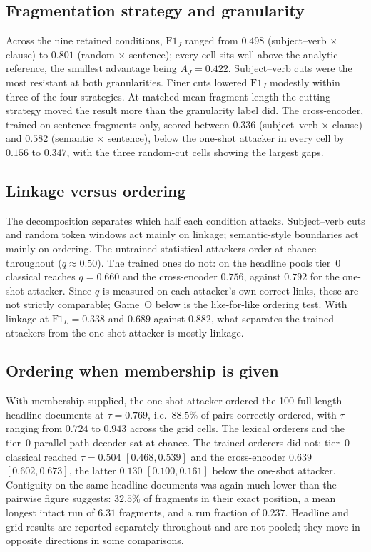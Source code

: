 \documentclass[sigconf,review]{acmart}
\newcommand{\FJ}{\ensuremath{\mathrm{F1}_{J}}}
\newcommand{\FL}{\ensuremath{\mathrm{F1}_{L}}}
\newcommand{\AJ}{\ensuremath{A_{J}}}
\begin{document}
\subsection{Fragmentation strategy and granularity}
\label{sec:res-grid}

Across the nine retained conditions, \FJ{} ranged from $0.498$ (subject--verb
$\times$ clause) to $0.801$ (random $\times$ sentence); every cell sits well
above the analytic reference, the smallest advantage being $\AJ = 0.422$.
Subject--verb cuts were the most resistant at both granularities. Finer cuts
lowered \FJ{} modestly within three of the four strategies. At matched mean
fragment length the cutting strategy moved the result more than the granularity
label did. The cross-encoder, trained on sentence fragments only, scored
between $0.336$ (subject--verb $\times$ clause) and $0.582$
(semantic $\times$ sentence), below the one-shot attacker in every cell by
$0.156$ to $0.347$, with the three random-cut cells showing the largest gaps.

\subsection{Linkage versus ordering}
\label{sec:res-decomp}

The decomposition separates which half each condition attacks. Subject--verb
cuts and random token windows act mainly on linkage; semantic-style boundaries
act mainly on ordering. The untrained statistical attackers order at chance
throughout ($q \approx 0.50$). The trained ones do not: on the headline pools
tier~0 classical reaches $q = 0.660$ and the cross-encoder $0.756$, against
$0.792$ for the one-shot attacker. Since $q$ is measured on each attacker's
own correct links, these are not strictly comparable; Game~O below is the
like-for-like ordering test. With linkage at $\FL = 0.338$ and $0.689$ against
$0.882$, what separates the trained attackers from the one-shot attacker is
mostly linkage.

\subsection{Ordering when membership is given}
\label{sec:res-gameO}

With membership supplied, the one-shot attacker ordered the 100 full-length
headline documents at $\tau = 0.769$, i.e.\ $88.5\%$ of pairs correctly
ordered, with $\tau$ ranging from $0.724$ to $0.943$ across the grid cells. The
lexical orderers and the tier~0 parallel-path decoder sat at chance. The
trained orderers did not: tier~0 classical reached $\tau = 0.504$
$[0.468, 0.539]$ and the cross-encoder $0.639$ $[0.602, 0.673]$, the latter
$0.130$ $[0.100, 0.161]$ below the one-shot attacker. Contiguity on the same headline
documents was again much lower than the pairwise figure suggests: $32.5\%$ of
fragments in their exact position, a mean longest intact run of $6.31$
fragments, and a run fraction of $0.237$. Headline and grid results are
reported separately throughout and are not pooled; they move in opposite
directions in some comparisons.
\end{document}
